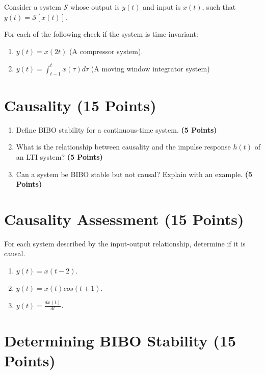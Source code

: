 \documentclass[12pt,xcolor=dvipsnames,svgnames,x11names]{article}
\begin{document}
Consider a system $\mathcal{S}$ whose output is $y(t)$ and input is $x(t)$, such that $y(t) = \mathcal{S}[x(t)]$.

For each of the following check if the system is time-invariant:

\begin{enumerate}
\item $y(t) = x(2t)$ (A compressor system).
\item $y(t) = \int_{t-1}^{t} x(\tau) d\tau$ (A moving window integrator system)
\end{enumerate}

\section{Causality (15 Points)}

\begin{enumerate}
\item Define BIBO stability for a continuous-time system. \textbf{(5 Points)}

\item What is the relationship between causality and the impulse response $h(t)$ of an LTI system? \textbf{(5 Points)}

\item Can a system be BIBO stable but not causal? Explain with an example. \textbf{(5 Points)}


\end{enumerate}


\section{Causality Assessment  (15 Points)}

For each system described by the input-output relationship, determine if it is causal.

\begin{enumerate}
\item $y(t) = x(t-2)$.

\item $y(t)=x(t)cos(t+1)$.

\item $y(t) = \frac{dx(t)}{dt}$.

\end{enumerate}

\section{Determining BIBO Stability (15 Points)}
\end{document}
